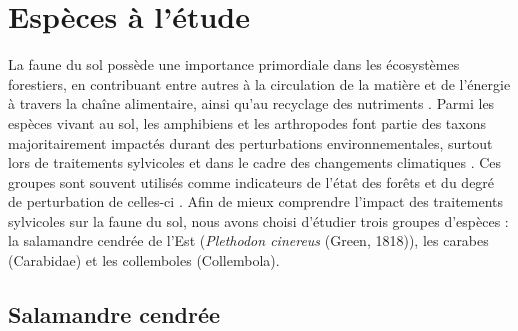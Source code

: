 \section*{Espèces à l'étude}
\label{sec:species}

La faune du sol possède une importance primordiale dans les écosystèmes forestiers, en contribuant entre autres à la circulation de la matière et de l'énergie à travers la chaîne alimentaire, ainsi qu'au recyclage des nutriments \citep{Seibold2021contributioninsects,Kudrin2023metaanalysiseffects}.
Parmi les espèces vivant au sol, les amphibiens et les arthropodes font partie des taxons majoritairement impactés durant des perturbations environnementales, 
surtout lors de traitements sylvicoles \citep{Stuart2004Statustrends,Semlitsch2009Effectstimber,Hartshorn2021reviewforest} et dans le cadre des changements climatiques \citep{Alford1999Globalamphibian,Houlahan2000Quantitativeevidence,Pounds2006Widespreadamphibian,Warren2018projectedeffect}. 
Ces groupes sont souvent utilisés comme indicateurs de l'état des forêts et du degré de perturbation de celles-ci \citep{pongeVerticalDistributionCollembola2000,birdChangesSoilLitter2004,Maleque2009Arthropodsbioindicators}.
Afin de mieux comprendre l'impact des traitements sylvicoles sur la faune du sol, nous avons choisi d'étudier trois groupes d'espèces : la salamandre cendrée de l'Est (\textit{Plethodon cinereus} (Green, 1818)), 
les carabes (Carabidae) et les collemboles (Collembola).

\subsection*{Salamandre cendrée}


